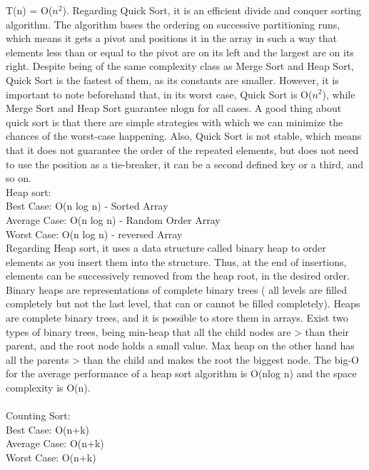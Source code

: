 \documentclass[12pt]{article}
\begin{document}
	T(n) = O($n^2$).
	Regarding Quick Sort, it is an efficient divide and conquer sorting algorithm.  The algorithm bases the ordering on successive partitioning runs, which means it gets a pivot and positions it in the array in such a way that elements less than or equal to the pivot are on its left and the largest are on its right. Despite being of the same complexity class as Merge Sort and Heap Sort, Quick Sort is the fastest of them, as its constants are smaller. However, it is important to note beforehand that, in its worst case, Quick Sort is O($n^2$), while Merge Sort and Heap Sort guarantee nlogn for all cases. A good thing about quick sort is that there are simple strategies with which we can minimize the chances of the worst-case happening. Also, Quick Sort is not stable, which means that it does not guarantee the order of the repeated elements, but does not need to use the position as a tie-breaker, it can be a second defined key or a third, and so on.\\ 
	
	
	\indent Heap sort:\\
	
	\indent Best Case: O(n log n) - Sorted Array\\
	\indent Average Case: O(n log n) - Random Order Array\\
	\indent Worst Case: O(n log n) - reversed Array\\
	
	Regarding Heap sort, it uses a data structure called binary heap to order elements as you insert them into the structure. Thus, at the end of insertions, elements can be successively removed from the heap root, in the desired order. Binary heaps are representations of complete binary trees ( all levels are filled completely but not the last level, that can or cannot be filled completely). Heaps are complete binary trees, and it is possible to store them in arrays. Exist two types of binary trees, being min-heap that all the child nodes are > than their parent, and the root node holds a small value.  Max heap on the other hand has all the parents > than the child and makes the root the biggest node. The big-O for the average performance of a heap sort algorithm is O(nlog n) and the space complexity is O(n).\\ \\
	\indent Counting Sort:\\
	
	\indent Best Case: O(n+k)\\
	\indent Average Case: O(n+k)\\
	\indent Worst Case: O(n+k)\\
	
\end{document}
